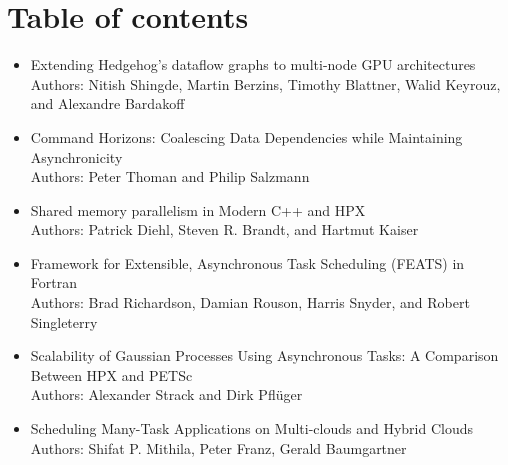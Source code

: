 \documentclass{llncs}
\begin{document}
\section*{Table of contents}

\begin{itemize}
    \item Extending Hedgehog’s dataflow graphs to
multi-node GPU architectures \\
Authors: Nitish Shingde, Martin Berzins, Timothy Blattner, Walid Keyrouz, and Alexandre Bardakoff
\item Command Horizons: Coalescing Data
Dependencies while Maintaining Asynchronicity \\
Authors: Peter Thoman and Philip Salzmann
\item Shared memory parallelism in Modern C++ and
HPX\\
Authors: Patrick Diehl, Steven R. Brandt, and Hartmut
Kaiser
\item Framework for Extensible, Asynchronous Task
Scheduling (FEATS) in Fortran\\
Authors: Brad Richardson, Damian Rouson, Harris Snyder, and Robert
Singleterry 
\item Scalability of Gaussian Processes Using
Asynchronous Tasks: A Comparison Between
HPX and PETSc \\
Authors: Alexander Strack and Dirk Pflüger
\item Scheduling Many-Task Applications on
Multi-clouds and Hybrid Clouds \\
Authors: Shifat P. Mithila, Peter Franz, Gerald Baumgartner

\end{itemize}
\end{document}
